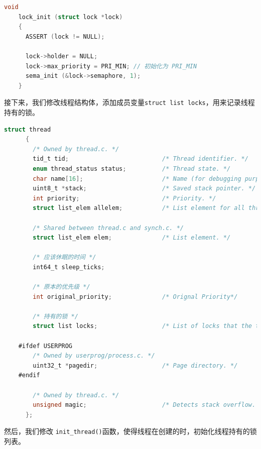 \documentclass{article}
\begin{document}
\begin{lstlisting}[language=C, title=修改后的\texttt{lock\_init()}函数]
    void
    lock_init (struct lock *lock)
    {
      ASSERT (lock != NULL);

      lock->holder = NULL;
      lock->max_priority = PRI_MIN; // 初始化为 PRI_MIN
      sema_init (&lock->semaphore, 1);
    }

\end{lstlisting}

接下来，我们修改线程结构体，添加成员变量\texttt{struct list locks}，用来记录线程持有的锁。

\begin{lstlisting}[language=C, title=修改后的线程结构体]
      struct thread
      {
        /* Owned by thread.c. */
        tid_t tid;                          /* Thread identifier. */
        enum thread_status status;          /* Thread state. */
        char name[16];                      /* Name (for debugging purposes). */
        uint8_t *stack;                     /* Saved stack pointer. */
        int priority;                       /* Priority. */
        struct list_elem allelem;           /* List element for all threads list. */

        /* Shared between thread.c and synch.c. */
        struct list_elem elem;              /* List element. */

        /* 应该休眠的时间 */
        int64_t sleep_ticks;

        /* 原本的优先级 */
        int original_priority;              /* Orignal Priority*/

        /* 持有的锁 */
        struct list locks;                  /* List of locks that the thread is holding. */

    #ifdef USERPROG
        /* Owned by userprog/process.c. */
        uint32_t *pagedir;                  /* Page directory. */
    #endif

        /* Owned by thread.c. */
        unsigned magic;                     /* Detects stack overflow. */
      };
\end{lstlisting}

然后，我们修改 \texttt{init\_thread()}函数，使得线程在创建的时，初始化线程持有的锁列表。
\end{document}

